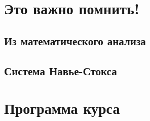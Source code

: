 
\LARGE



\section*{Это важно помнить!}

\subsection*{Из математического анализа}


\subsection*{Система Навье-Стокса}


\newpage
\section*{Программа курса}





